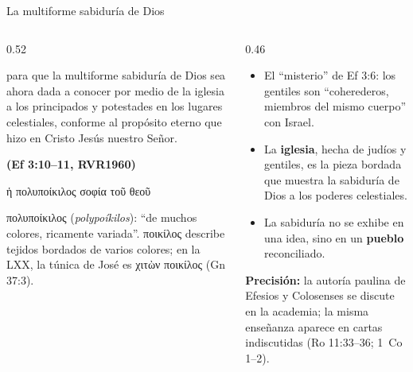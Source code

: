 \documentclass[hyperref={bookmarks=false},aspectratio=169]{beamer}
\newcommand{\grc}[1]{\foreignlanguage{ancientgreek}{#1}}
\newcommand{\fuente}[1]{\par\hfill{\upshape\bfseries\footnotesize\textcolor{azul}{#1}}}
\newcommand{\destacar}[1]{\textbf{\textcolor{azul}{#1}}}
\newcommand{\precision}[1]{{\footnotesize\color{gris}\textbf{Precisión:} #1}}
\begin{document}
\begin{frame}{La multiforme sabiduría de Dios}
\begin{columns}[t,onlytextwidth]
\begin{column}{0.52\textwidth}
\begin{cita}para que la multiforme sabiduría de Dios sea ahora dada a conocer por medio de la iglesia a los principados y potestades en los lugares celestiales, conforme al propósito eterno que hizo en Cristo Jesús nuestro Señor.\fuente{(Ef 3:10--11, RVR1960)}\end{cita}
\begin{center}\grc{ἡ πολυποίκιλος σοφία τοῦ θεοῦ}\end{center}
\scriptsize \grc{πολυποίκιλος} (\emph{polypoíkilos}): ``de muchos colores, ricamente variada''. \grc{ποικίλος} describe tejidos bordados de varios colores; en la LXX, la túnica de José es \grc{χιτὼν ποικίλος} (Gn 37:3).
\end{column}
\begin{column}{0.46\textwidth}\small
\begin{itemize}
\item El ``misterio'' de Ef 3:6: los gentiles son ``coherederos, miembros del mismo cuerpo'' con Israel.
\item La \destacar{iglesia}, hecha de judíos y gentiles, es la pieza bordada que muestra la sabiduría de Dios a los poderes celestiales.
\item La sabiduría no se exhibe en una idea, sino en un \destacar{pueblo} reconciliado.
\end{itemize}
\precision{la autoría paulina de Efesios y Colosenses se discute en la academia; la misma enseñanza aparece en cartas indiscutidas (Ro 11:33--36; 1~Co 1--2).}
\end{column}
\end{columns}
\end{frame}
\end{document}
